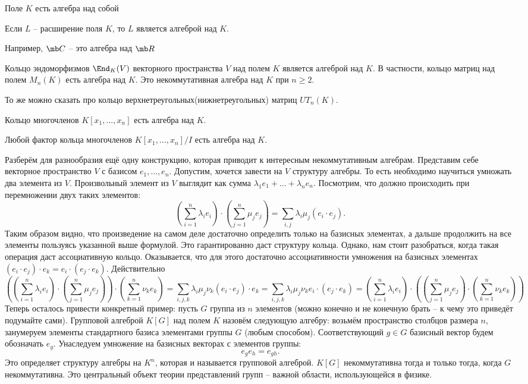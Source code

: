 \exm
\enm
\setcounter{enumi}{-1}
\item Поле $K$ есть алгебра над собой
\item Если $L$ -- расширение поля $K$, то $L$ является алгеброй над $K$.
\item Например, $\mb C$ -- это алгебра над $\mb R$
\item Кольцо эндоморфизмов $\End_K(V)$ векторного пространства $V$ над полем $K$ является алгеброй над $K$. В частности, кольцо матриц над полем $M_n(K)$ есть алгебра над $K$. Это некоммутативная алгебра над $K$ при $n\geq 2$. 
\item То же можно сказать про кольцо верхнетреугольных(нижнетреугольных) матриц $UT_n(K)$.
\item Кольцо многочленов $K[x_1,\dots,x_n]$ есть алгебра над $K$.
\item Любой фактор кольца многочленов $K[x_1,\dots,x_n]/I$ есть алгебра над $K$.
\item Разберём для разнообразия ещё одну конструкцию, которая приводит к интересным некоммутативным алгебрам. Представим себе векторное пространство $V$ с базисом $e_1,\dots,e_n$. Допустим, хочется завести на $V$ структуру алгебры. То есть необходимо научиться умножать два элемента из $V$. Произвольный элемент из $V$ выглядит как сумма $\lambda_1 e_1+\dots+\lambda_n e_n$. Посмотрим, что должно происходить при перемножении двух таких элементов:
$$(\sum_{i=1}^n \lambda_i e_i)\cdot (\sum_{j=1}^n \mu_j e_j)=\sum_{i,j} \lambda_i\mu_j (e_i\cdot e_j).$$
Таким образом видно, что произведение на самом деле достаточно определить только на базисных элементах, а дальше продолжить на все элементы пользуясь указанной выше формулой. Это гарантированно даст структуру кольца. Однако, нам стоит разобраться, когда такая операция даст ассоциативную кольцо. Оказывается, что для этого достаточно ассоциативности умножения на базисных элементах $(e_i\cdot e_j)\cdot e_k=e_i\cdot (e_j\cdot e_k)$. Действительно
$$\left((\sum_{i=1}^n \lambda_i e_i)\cdot (\sum_{j=1}^n \mu_j e_j)\right)\cdot(\sum_{k=1}^n \nu_k e_k)= \sum_{i,j,k} \lambda_i\mu_j \nu_k (e_i\cdot e_j)\cdot e_k=\sum_{i,j,k} \lambda_i\mu_j \nu_k e_i\cdot (e_j \cdot e_k)=(\sum_{i=1}^n \lambda_i e_i)\cdot \left((\sum_{j=1}^n \mu_j e_j)\cdot(\sum_{k=1}^n \nu_k e_k)\right)$$
Теперь осталось привести конкретный пример: пусть $G$ группа из $n$ элементов (можно конечно и не конечную брать -- к чему это приведёт подумайте сами). Групповой алгеброй $K[G]$ над полем $K$ назовём следующую алгебру: возьмём пространство столбцов размера $n$, занумеруем элементы стандартного базиса элементами группы $G$ (любым способом). Соответствующий $g\in G$ базисный вектор будем обозначать $e_g$. Унаследуем умножение на базисных векторах с элементов группы:
$$e_g e_h=e_{gh}.$$
Это определяет структуру алгебры на $K^n$, которая и называется групповой алгеброй. $K[G]$ некоммутативна тогда и только тогда, когда $G$ некоммутативна. Это центральный объект теории представлений групп -- важной области, использующейся в физике.
\eenm






